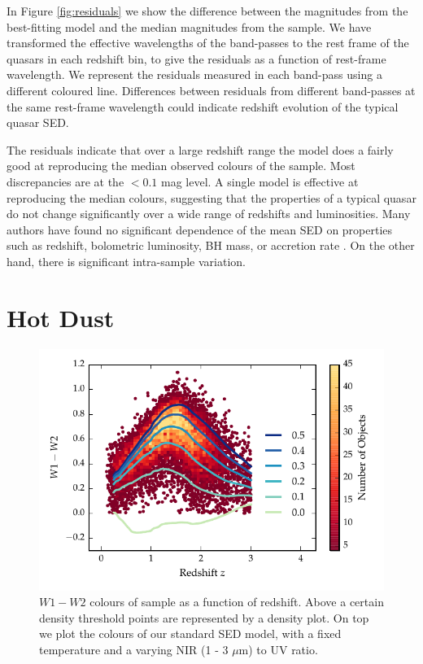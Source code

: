 In Figure \ref{fig:residuals} we show the difference between the magnitudes from the best-fitting model and the median magnitudes from the sample. 
We have transformed the effective wavelengths of the band-passes to the rest frame of the quasars in each redshift bin, to give the residuals as a function of rest-frame wavelength. 
We represent the residuals measured in each band-pass using a different coloured line. 
Differences between residuals from different band-passes at the same rest-frame wavelength could indicate redshift evolution of the typical quasar SED. 

The residuals indicate that over a large redshift range the model does a fairly good at reproducing the median observed colours of the sample. 
Most discrepancies are at the $<0.1$ mag level. 
A single model is effective at reproducing the median colours, suggesting that the properties of a typical quasar do not change significantly over a wide range of redshifts and luminosities. 
Many authors have found no significant dependence of the mean SED on properties such as redshift, bolometric luminosity, BH mass, or accretion rate \citep[e.g.][]{elvis12,hao13}. 
On the other hand, there is significant intra-sample variation. 

\section{Hot Dust}

\begin{figure}
\centering
\includegraphics[width=\columnwidth]{figures/chapter05/w1w2_versus_redshift_ratio.pdf}
\caption[{$W1 - W2$ colours of sample as a function of redshift.}]{$W1 - W2$ colours of sample as a function of redshift. Above a certain density threshold points are represented by a density plot. On top we plot the colours of our standard SED model, with a fixed temperature and a varying NIR (1 - 3 $\mu$m) to UV ratio.}
  \label{fig:w1w2colorsratio}
\end{figure}


